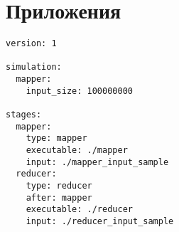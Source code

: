 \documentclass[../../thesis.tex]{subfile}
\begin{document}
    \section{Приложения}

    \begin{lstlisting}[label={lst:specfile}, caption={Конфигурационный файл}]
version: 1

simulation:
  mapper:
    input_size: 100000000

stages:
  mapper:
    type: mapper
    executable: ./mapper
    input: ./mapper_input_sample
  reducer:
    type: reducer
    after: mapper
    executable: ./reducer
    input: ./reducer_input_sample
    \end{lstlisting}
\end{document}
